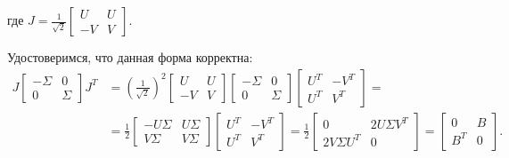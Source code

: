 где \(J= \frac{1}{\sqrt{2}}\begin{bmatrix}
    U & U \\
    -V & V
\end{bmatrix}\).

Удостоверимся, что данная форма корректна:
\begin{equation*}
    \begin{split}
        J \begin{bmatrix} -\Sigma & 0 \\ 0 & \Sigma \end{bmatrix} J^T 
        &= \left( \frac{1}{\sqrt{2}}\right)^2 
            \begin{bmatrix} U & U \\ -V & V \end{bmatrix}
            \begin{bmatrix} -\Sigma & 0 \\ 0 & \Sigma \end{bmatrix}
            \begin{bmatrix} U^T & -V^T \\ U^T & V^T \end{bmatrix}= \\[6pt]
        &= \frac{1}{2} 
            \begin{bmatrix} -U\Sigma & U\Sigma \\ V\Sigma & V\Sigma \end{bmatrix}
            \begin{bmatrix} U^T & -V^T \\ U^T & V^T \end{bmatrix}= \frac{1}{2} 
            \begin{bmatrix} 0 & 2 U\Sigma V^T \\ 2 V\Sigma U^T & 0 \end{bmatrix} = \begin{bmatrix} 0 & B \\ B^T & 0 \end{bmatrix}.
    \end{split}
\end{equation*}


